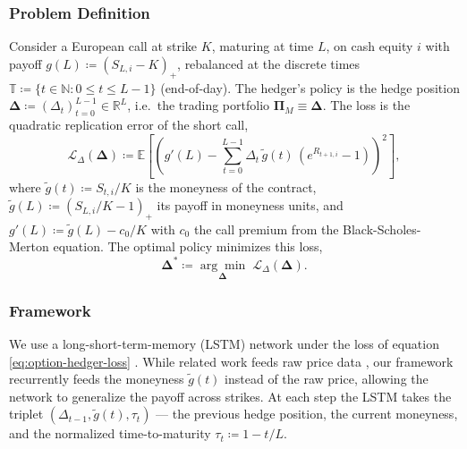     \subsubsection{Problem Definition}
    Consider a European call at strike \(K\), maturing at time \(L\), on
    cash equity \(i\) with payoff \(g(L) \coloneq (S_{L,i} - K)_+\),
    rebalanced at the discrete times \(\mathbb{T} \coloneq \{t \in
    \mathbb{N} : 0 \leq t \leq L-1\}\) (end-of-day). The hedger's policy
    is the hedge position \(\mathbf{\Delta} \coloneq (\Delta_t)_{t=0}^{L-1}
    \in \mathbb{R}^{L}\), i.e.\ the trading portfolio \(\mathbf{\Pi}_M
    \equiv \mathbf{\Delta}\). The loss is the quadratic replication
    error of the short call,
    \begin{equation}
      \mathcal{L}_{\Delta}(\mathbf{\Delta}) \coloneq
      \mathbb{E}\left[\left(g'(L) - \sum_{t=0}^{L-1} \Delta_{t}\,
      \tilde{g}(t)\, \left(e^{R_{t+1,i}} - 1\right)\right)^2\right],
      \label{eq:option-hedger-loss}
    \end{equation}
    where \(\tilde{g}(t) \coloneq S_{t,i}/K\) is the moneyness of the
    contract, \(\tilde{g}(L) \coloneq (S_{L,i}/K - 1)_+\) its payoff in
    moneyness units, and \(g'(L) \coloneq \tilde{g}(L) - c_0/K\) with
    \(c_0\) the call premium from the Black-Scholes-Merton equation. The
    optimal policy minimizes this loss,
    \begin{equation}
      \mathbf{\Delta}^{*} \coloneq \underset{\mathbf{\Delta}}{\arg\min}\;
      \mathcal{L}_{\Delta}(\mathbf{\Delta}).
      \label{eq:option-hedger-optimizer}
    \end{equation}

    \subsubsection{Framework}
    We use a long-short-term-memory (LSTM) network under the loss of
    equation \ref{eq:option-hedger-loss} \cite{Fecamp20}. While related
    work feeds raw price data \cite{Fecamp20,Boursin22,Tanaka25}, our
    framework recurrently feeds the moneyness \(\tilde{g}(t)\) instead of
    the raw price, allowing the network to generalize the payoff across
    strikes. At each step the LSTM takes the triplet
    \((\Delta_{t-1}, \tilde{g}(t), \tau_t)\) --- the previous hedge
    position, the current moneyness, and the normalized time-to-maturity
    \(\tau_t \coloneq 1 - t/L\).

